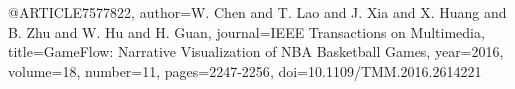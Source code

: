 @ARTICLE{7577822,
  author={W. {Chen} and T. {Lao} and J. {Xia} and X. {Huang} and B. {Zhu} and W. {Hu} and H. {Guan}},
  journal={IEEE Transactions on Multimedia}, 
  title={GameFlow: Narrative Visualization of NBA Basketball Games}, 
  year={2016},
  volume={18},
  number={11},
  pages={2247-2256},
  doi={10.1109/TMM.2016.2614221}}